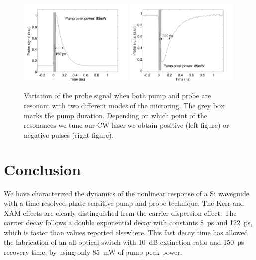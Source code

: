 \begin{figure}[htb]
    \centering
    \includegraphics[width=0.49\textwidth]{pos_pulse_big}
    \includegraphics[width=0.49\textwidth]{neg_pulse_big}
    \caption{Variation of the probe signal when both pump and probe are resonant with two different modes of the microring. The grey box marks the pump duration. Depending on which point of the resonances we tune our CW laser we obtain positive (left figure) or negative pulses (right figure).}
    \label{fig:ntc02switching}
\end{figure}

\section{Conclusion}
We have characterized the dynamics of the nonlinear response of a Si waveguide with a time-resolved phase-sensitive pump and probe technique. The Kerr and XAM effects are clearly distinguished from the carrier dispersion effect. The carrier decay follows a double exponential decay with constants 8~ps and 122~ps, which is faster than values reported elsewhere. This fast decay time has allowed the fabrication of an all-optical switch with 10~dB extinction ratio and 150~ps recovery time, by using only 85~mW of pump peak power.

\pagestyle{empty}


\pagestyle{fancy}
\lhead{}
\renewcommand{\chaptermark}[1]{\markboth{\thechapter.\ #1}{}}
